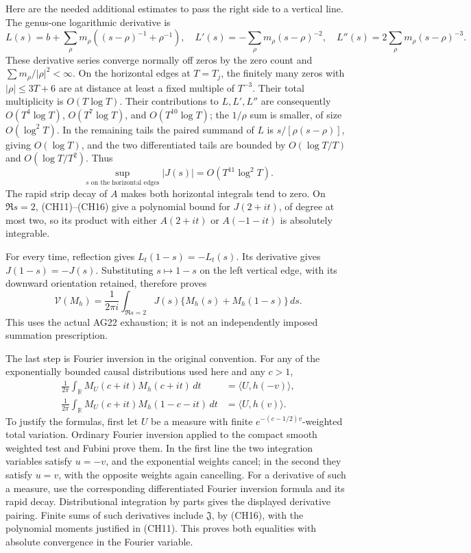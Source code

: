 \documentclass[
  10pt,
  a4paper,
]{article}
\begin{document}
Here are the needed additional estimates to pass the right side to a
vertical line. The genus-one logarithmic derivative is \[
L(s)=b+\sum_\rho m_\rho\left((s-\rho)^{-1}+\rho^{-1}\right),
\quad L'(s)=-\sum_\rho m_\rho(s-\rho)^{-2},
\quad L''(s)=2\sum_\rho m_\rho(s-\rho)^{-3}.
\tag{CH18}
\] These derivative series converge normally off zeros by the zero count
and \(\sum m_\rho/|\rho|^2<\infty\). On the horizontal edges at
\(T=T_j\), the finitely many zeros with \(|\rho|\le3T+6\) are at
distance at least a fixed multiple of \(T^{-3}\). Their total
multiplicity is \(O(T\log T)\). Their contributions to \(L,L',L''\) are
consequently \(O(T^4\log T)\), \(O(T^7\log T)\), and
\(O(T^{10}\log T)\); the \(1/\rho\) sum is smaller, of size
\(O(\log^2T)\). In the remaining tails the paired summand of \(L\) is
\(s/[\rho(s-\rho)]\), giving \(O(\log T)\), and the two differentiated
tails are bounded by \(O(\log T/T)\) and \(O(\log T/T^2)\). Thus \[
\sup_{s\text{ on the horizontal edges}}|J(s)|
=O(T^{11}\log^2T).
\tag{CH19}
\] The rapid strip decay of \(A\) makes both horizontal integrals tend
to zero. On \(\Re s=2\), (CH11)--(CH16) give a polynomial bound for
\(J(2+it)\), of degree at most two, so its product with either
\(A(2+it)\) or \(A(-1-it)\) is absolutely integrable.

For every time, reflection gives \(L_t(1-s)=-L_t(s)\). Its derivative
gives \(J(1-s)=-J(s)\). Substituting \(s\mapsto1-s\) on the left
vertical edge, with its downward orientation retained, therefore proves
\[
\mathcal V(M_h)=\frac1{2\pi i}\int_{\Re s=2}
J(s)\{M_h(s)+M_h(1-s)\}\,ds.
\tag{CH20}
\] This uses the actual AG22 exhaustion; it is not an independently
imposed summation prescription.

The last step is Fourier inversion in the original convention. For any
of the exponentially bounded causal distributions used here and any
\(c>1\), \[
\begin{aligned}
\frac1{2\pi}\int_{\mathbb R}M_U(c+it)M_h(c+it)\,dt
&=\langle U,h(-v)\rangle,\\
\frac1{2\pi}\int_{\mathbb R}M_U(c+it)M_h(1-c-it)\,dt
&=\langle U,h(v)\rangle.
\end{aligned}
\tag{CH21}
\] To justify the formulas, first let \(U\) be a measure with finite
\(e^{-(c-1/2)v}\)-weighted total variation. Ordinary Fourier inversion
applied to the compact smooth weighted test and Fubini prove them. In
the first line the two integration variables satisfy \(u=-v\), and the
exponential weights cancel; in the second they satisfy \(u=v\), with the
opposite weights again cancelling. For a derivative of such a measure,
use the corresponding differentiated Fourier inversion formula and its
rapid decay. Distributional integration by parts gives the displayed
derivative pairing. Finite sums of such derivatives include
\(\mathfrak J\), by (CH16), with the polynomial moments justified in
(CH11). This proves both equalities with absolute convergence in the
Fourier variable.
\end{document}
